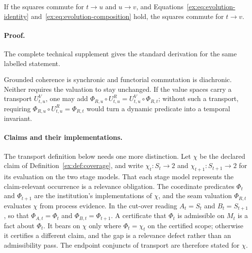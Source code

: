 \documentclass[twocolumn,envcountsect,envcountsame,natbib]{svjour3}
\begin{document}
\begin{proposition}\label{ex:prop:commutation-composes}
If the squares commute for $t\to u$ and $u\to v$, and Equations~\eqref{ex:eq:evolution-identity} and~\eqref{ex:eq:evolution-composition} hold, the squares commute for $t\to v$.
\end{proposition}

\paragraph{Proof.} The complete technical supplement gives the standard derivation for the same labelled statement.

Grounded coherence is synchronic and functorial commutation is diachronic. Neither requires the valuation to stay unchanged. If the value spaces carry a transport $U^V_{t,u}$, one may add $\Phi_{R,u} \circ U^R_{t,u}=U^V_{t,u} \circ \Phi_{R,t}$; without such a transport, requiring $\Phi_{R,u} \circ U^R_{t,u}=\Phi_{R,t}$ would turn a dynamic predicate into a temporal invariant.

\paragraph{Claims and their implementations.} The transport definition below needs one more distinction. Let $\chi$ be the declared claim of Definition~\ref{ex:def:coverage}, and write $\chi_t:S_t\to2$ and $\chi_{t+1}:S_{t+1}\to2$ for its evaluation on the two stage models. That each stage model represents the claim-relevant occurrence is a relevance obligation. The coordinate predicates $\Phi_t$ and $\Phi_{t+1}$ are the institution's implementations of $\chi$, and the seam valuation $\Phi_{R,t}$ evaluates $\chi$ from process evidence. In the cut-over reading $A_t=S_t$ and $B_t=S_{t+1}$, so that $\Phi_{A,t}=\Phi_t$ and $\Phi_{B,t}=\Phi_{t+1}$. A certificate that $\Phi_t$ is admissible on $M_t$ is a fact about $\Phi_t$. It bears on $\chi$ only where $\Phi_t=\chi_t$ on the certified scope; otherwise it certifies a different claim, and the gap is a relevance defect rather than an admissibility pass. The endpoint conjuncts of transport are therefore stated for $\chi$.
\end{document}

